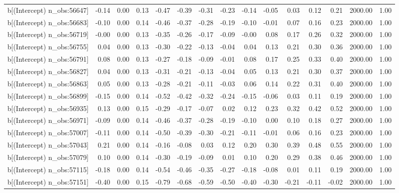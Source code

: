 \begin{table}[ht]
\begin{tabular}{rrrrrrrrrrrrrrr}
  b[(Intercept) n\_obs:56647] & -0.14 & 0.00 & 0.13 & -0.47 & -0.39 & -0.31 & -0.23 & -0.14 & -0.05 & 0.03 & 0.12 & 0.21 & 2000.00 & 1.00 \\ 
  b[(Intercept) n\_obs:56683] & -0.10 & 0.00 & 0.14 & -0.46 & -0.37 & -0.28 & -0.19 & -0.10 & -0.01 & 0.07 & 0.16 & 0.23 & 2000.00 & 1.00 \\ 
  b[(Intercept) n\_obs:56719] & -0.00 & 0.00 & 0.13 & -0.35 & -0.26 & -0.17 & -0.09 & -0.00 & 0.08 & 0.17 & 0.26 & 0.32 & 2000.00 & 1.00 \\ 
  b[(Intercept) n\_obs:56755] & 0.04 & 0.00 & 0.13 & -0.30 & -0.22 & -0.13 & -0.04 & 0.04 & 0.13 & 0.21 & 0.30 & 0.36 & 2000.00 & 1.00 \\ 
  b[(Intercept) n\_obs:56791] & 0.08 & 0.00 & 0.13 & -0.27 & -0.18 & -0.09 & -0.01 & 0.08 & 0.17 & 0.25 & 0.33 & 0.40 & 2000.00 & 1.00 \\ 
  b[(Intercept) n\_obs:56827] & 0.04 & 0.00 & 0.13 & -0.31 & -0.21 & -0.13 & -0.04 & 0.05 & 0.13 & 0.21 & 0.30 & 0.37 & 2000.00 & 1.00 \\ 
  b[(Intercept) n\_obs:56863] & 0.05 & 0.00 & 0.13 & -0.28 & -0.21 & -0.11 & -0.03 & 0.06 & 0.14 & 0.22 & 0.31 & 0.40 & 2000.00 & 1.00 \\ 
  b[(Intercept) n\_obs:56899] & -0.15 & 0.00 & 0.14 & -0.52 & -0.42 & -0.32 & -0.24 & -0.15 & -0.06 & 0.03 & 0.11 & 0.19 & 2000.00 & 1.00 \\ 
  b[(Intercept) n\_obs:56935] & 0.13 & 0.00 & 0.15 & -0.29 & -0.17 & -0.07 & 0.02 & 0.12 & 0.23 & 0.32 & 0.42 & 0.52 & 2000.00 & 1.00 \\ 
  b[(Intercept) n\_obs:56971] & -0.09 & 0.00 & 0.14 & -0.46 & -0.37 & -0.28 & -0.19 & -0.10 & 0.00 & 0.10 & 0.18 & 0.27 & 2000.00 & 1.00 \\ 
  b[(Intercept) n\_obs:57007] & -0.11 & 0.00 & 0.14 & -0.50 & -0.39 & -0.30 & -0.21 & -0.11 & -0.01 & 0.06 & 0.16 & 0.23 & 2000.00 & 1.00 \\ 
  b[(Intercept) n\_obs:57043] & 0.21 & 0.00 & 0.14 & -0.16 & -0.08 & 0.03 & 0.12 & 0.20 & 0.30 & 0.39 & 0.48 & 0.55 & 2000.00 & 1.00 \\ 
  b[(Intercept) n\_obs:57079] & 0.10 & 0.00 & 0.14 & -0.30 & -0.19 & -0.09 & 0.01 & 0.10 & 0.20 & 0.29 & 0.38 & 0.46 & 2000.00 & 1.00 \\ 
  b[(Intercept) n\_obs:57115] & -0.18 & 0.00 & 0.14 & -0.54 & -0.46 & -0.35 & -0.27 & -0.18 & -0.08 & 0.01 & 0.11 & 0.19 & 2000.00 & 1.00 \\ 
  b[(Intercept) n\_obs:57151] & -0.40 & 0.00 & 0.15 & -0.79 & -0.68 & -0.59 & -0.50 & -0.40 & -0.30 & -0.21 & -0.11 & -0.02 & 2000.00 & 1.00 \\ 

\end{tabular}
\end{table}
